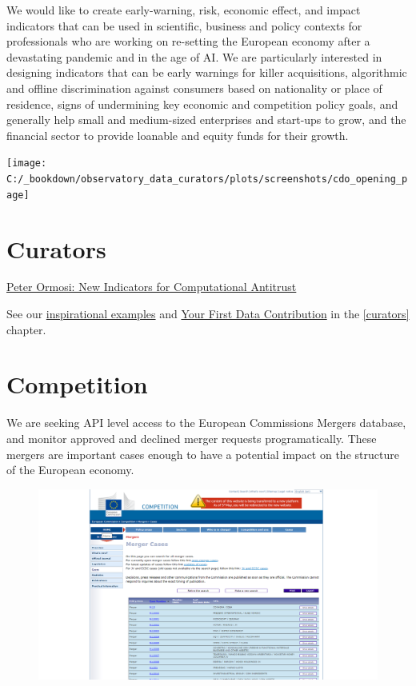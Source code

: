 \documentclass[
  a4paper,
  openany, a4paper, oneside]{book}
\begin{document}
We would like to create early-warning, risk, economic effect, and impact indicators that can be used in scientific, business and policy contexts for professionals who are working on re-setting the European economy after a devastating pandemic and in the age of AI. We are particularly interested in designing indicators that can be early warnings for killer acquisitions, algorithmic and offline discrimination against consumers based on nationality or place of residence, signs of undermining key economic and competition policy goals, and generally help small and medium-sized enterprises and start-ups to grow, and the financial sector to provide loanable and equity funds for their growth.

\begin{center}\texttt{[image: C:/\_bookdown/observatory\_data\_curators/plots/screenshots/cdo\_opening\_page]} \end{center}

\hypertarget{competition-curators}{%
\section{Curators}\label{competition-curators}}

\href{https://economy.dataobservatory.eu/post/2021-06-02-data-curator-peter-ormosi/}{Peter Ormosi: New Indicators for Computational Antitrust}

See our \href{\%7B\#get-inspired\%7D}{inspirational examples} and \protect\hyperlink{first-contribution}{Your First Data Contribution} in the \ref{curators} chapter.

\hypertarget{compeition-indicators}{%
\section{Competition}\label{compeition-indicators}}

We are seeking API level access to the European Commissions Mergers database, and monitor approved and declined merger requests programatically. These mergers are important cases enough to have a potential impact on the structure of the European economy.

\begin{figure}

{\centering \includegraphics[width=0.8\linewidth]{plots/screenshots/ec_competition_merger_screenshot} 

}

\end{figure}
\end{document}
